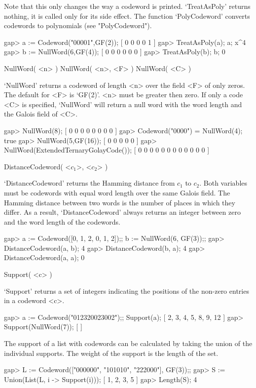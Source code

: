 Note that this only changes the way a codeword is printed.  `TreatAsPoly'
returns nothing,  it is called   only for its  side  effect. The function
`PolyCodeword' converts codewords to polynomials (see "PolyCodeword").

\beginexample
gap> a := Codeword("00001",GF(2));
[ 0 0 0 0 1 ]
gap> TreatAsPoly(a); a;
x^4
gap> b := NullWord(6,GF(4));
[ 0 0 0 0 0 0 ]
gap> TreatAsPoly(b); b;
0 
\endexample


\>NullWord( <n> )
\>NullWord( <n>, <F> )
\>NullWord( <C> )

`NullWord' returns  a codeword of  length <n> over the  field <F> of only
zeros.  The default for <F> is `GF(2)'. <n> must be greater then zero. If
only a code <C> is specified, `NullWord' will return a null word with the
word length and the Galois field of <C>.

\beginexample
gap> NullWord(8);
[ 0 0 0 0 0 0 0 0 ]
gap> Codeword("0000") = NullWord(4);
true
gap> NullWord(5,GF(16));
[ 0 0 0 0 0 ]
gap> NullWord(ExtendedTernaryGolayCode());
[ 0 0 0 0 0 0 0 0 0 0 0 0 ] 
\endexample

\>DistanceCodeword( <$c_1$>, <$c_2$> )

`DistanceCodeword' returns the Hamming distance from $c_1$ to $c_2$. Both
variables  must be codewords with equal  word length over the same Galois
field. The Hamming distance between two words  is the number of places in
which  they  differ. As a  result,  `DistanceCodeword'  always returns an
integer between zero and the word length of the codewords.

\beginexample
gap> a := Codeword([0, 1, 2, 0, 1, 2]);; b := NullWord(6, GF(3));;
gap> DistanceCodeword(a, b);
4
gap> DistanceCodeword(b, a);
4
gap> DistanceCodeword(a, a);
0 
\endexample

\>Support( <c> )

`Support' returns  a set  of integers  indicating   the positions of  the
non-zero entries in a codeword <c>.

\beginexample
gap> a := Codeword("012320023002");; Support(a);
[ 2, 3, 4, 5, 8, 9, 12 ]
gap> Support(NullWord(7));
[  ] 
\endexample

The support  of  a list with  codewords  can be calculated by  taking the
union of the individual supports. The weight of the support is the length
of the set.

\beginexample
gap> L := Codeword(["000000", "101010", "222000"], GF(3));;
gap> S := Union(List(L, i -> Support(i)));
[ 1, 2, 3, 5 ]
gap> Length(S);
4 
\endexample

